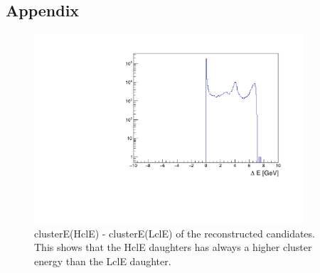 \documentclass[a4paper,11pt,twosided,final,german,openbib,pdftex,listof=totoc,bibliography=totoc]{scrbook}
\begin{document}
\begin{appendix}
	

	
	
\chapter{Appendix}

\begin{figure}[h!]
	\centering
	\includegraphics[width=10cm]{AnhangPlots/clEDiff.pdf}
	\caption[clusterE(HclE) - clusterE(LclE)]{clusterE(HclE) - clusterE(LclE) of the reconstructed candidates. This shows that the HclE daughters has always a higher cluster energy than the LclE daughter.}
	\label{fig:clEDiff}
\end{figure}














\end{appendix}
\end{document}
